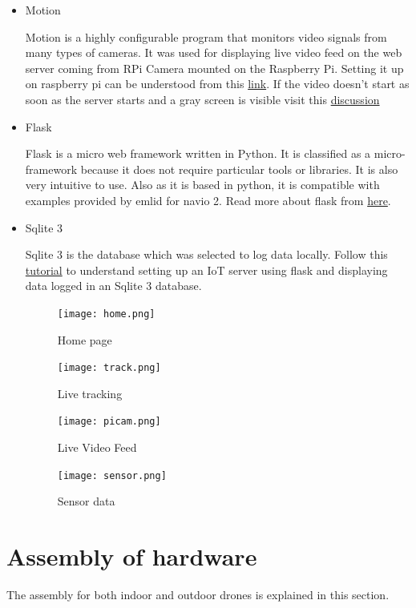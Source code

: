 \documentclass[a4paper,12pt,oneside]{book}
\begin{document}
\begin{itemize}
  \item Motion
  
  Motion is a highly configurable program that monitors video signals from many types of cameras. It was used for displaying live video feed on the web server coming from RPi Camera mounted on the Raspberry Pi. Setting it up  on raspberry pi can be understood from this \href{https://pimylifeup.com/raspberry-pi-webcam-server/}{link}. If the video doesn't start as soon as the server starts and a gray screen is visible visit this \href{https://raspberrypi.stackexchange.com/questions/60669/unable-to-open-video-device
}{discussion}
  
 
  \item Flask
  
  Flask is a micro web framework written in Python. It is classified as a micro-framework because it does not require particular tools or libraries. It is also very intuitive to use. Also as it is based in python, it is compatible with examples provided by emlid for navio 2. Read more about flask from \href{http://flask.pocoo.org/docs/}{here}.
  
  \item Sqlite 3
  
	Sqlite 3 is the database which was selected to log data locally. Follow this 
  \href{http://www.instructables.com/id/From-Data-to-Graph-a-Web-Jorney-With-Flask-and-SQL
}{tutorial} to understand setting up an IoT server using flask and displaying data logged in an Sqlite 3 database. 
  \begin{figure}[H]
  \centering
  \texttt{[image: home.png]}
  \caption{Home page}
  \end{figure}
  \begin{figure}[H]
  \centering
  \texttt{[image: track.png]}
  \caption{Live tracking}
  \end{figure}
  \begin{figure}[H]
  \centering
  \texttt{[image: picam.png]}
  \caption{Live Video Feed}
  \end{figure}
  \begin{figure}[H]
  \centering
  \texttt{[image: sensor.png]}
  \caption{Sensor data}
  \end{figure}
\end{itemize}

\section{Assembly of hardware}
The assembly for both indoor and outdoor drones is explained in this section. 
\end{document}
